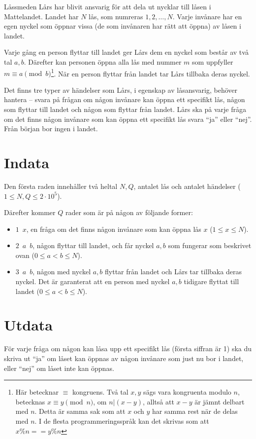 Låssmeden Lårs har blivit ansvarig för att dela ut nycklar till låsen i Mattelandet. Landet har $N$ lås, som numreras $1,2,\ldots,N$. Varje invånare har en egen nyckel som öppnar vissa (de som invånaren har rätt att öppna) av låsen i landet.

Varje gång en person flyttar till landet ger Lårs dem en nyckel som består av två tal $a,b$. Därefter kan personen öppna alla lås med nummer $m$ som uppfyller $m\equiv a \pmod{b}$\footnote{Här betecknar $\equiv$ kongruens. Två tal $x,y$ sägs vara kongruenta modulo $n$, betecknas $x\equiv y \pmod{n}$, om $n|(x-y)$, alltså att $x-y$ är jämnt delbart med $n$. Detta är samma sak som att $x$ och $y$ har samma rest när de delas med $n$. I de flesta programmeringsspråk kan det skrivas som att $x\%n==y\%n$}. När en person flyttar från landet tar Lårs tillbaka deras nyckel. 

Det finns tre typer av händelser som Lårs, i egenskap av låsansvarig, behöver hantera -- svara på frågan om någon invånare kan öppna ett specifikt lås, någon som flyttar till landet och någon som flyttar från landet. Lårs ska på varje fråga om det finns någon invånare som kan öppna ett specifikt lås svara ``ja'' eller ``nej''. Från början bor ingen i landet.

\section*{Indata}
Den första raden innehåller två heltal $N,Q$, antalet lås och antalet händelser ($1\leq N,Q \leq 2\cdot 10^5$).

Därefter kommer $Q$ rader som är på någon av följande former:
\begin{itemize}
  \item $1\enspace x$, en fråga om det finns någon invånare som kan öppna lås $x$ ($1\leq x \leq N$).
  \item $2\enspace a\enspace b$, någon flyttar till landet, och får nyckel $a,b$ som fungerar som beskrivet ovan ($0\leq a < b \leq N$).
  \item $3\enspace a\enspace b$, någon med nyckel $a,b$ flyttar från landet och Lårs tar tillbaka deras nyckel. Det är garanterat att en person med nyckel $a,b$ tidigare flyttat till landet ($0\leq a < b \leq N$).
\end{itemize}

\section*{Utdata}
För varje fråga om någon kan låsa upp ett specifikt lås (första siffran är 1) ska du skriva ut ``ja'' om låset kan öppnas av någon invånare som just nu bor i landet, eller ``nej'' om låset inte kan öppnas.

